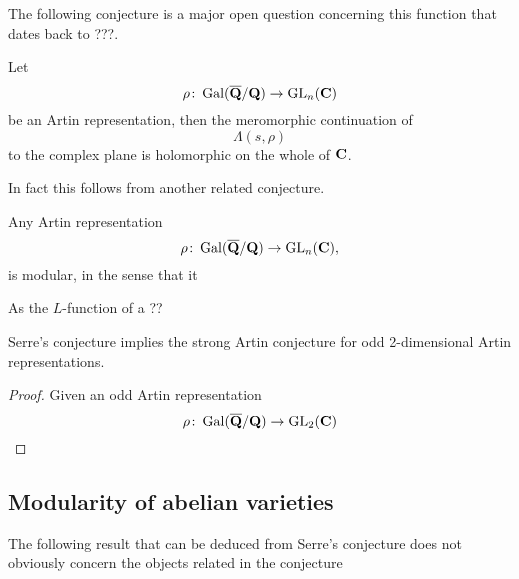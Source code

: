 \documentclass[a4paper,12pt]{article}
\begin{document}
The following conjecture is a major open question concerning this function that dates back to ???. %

\begin{conjecture}
Let
\[
\rho\colon \operatorname{Gal}(\overline{\mathbf{Q}}/\mathbf{Q}) \to \operatorname{GL}_n(\mathbf{C})
\]
be an Artin representation, then the meromorphic continuation of
\[
\Lambda(s,\rho)
\]
to the complex plane is holomorphic on the whole of $\mathbf{C}$.
\end{conjecture}

In fact this follows from another related conjecture.

\begin{conjecture}
Any Artin representation
\[
\rho\colon \operatorname{Gal}(\overline{\mathbf{Q}}/\mathbf{Q}) \to \operatorname{GL}_n(\mathbf{C}),
\]
is modular, in the sense that it
\end{conjecture}

As the $L$-function of a ??

\begin{prop}
Serre's conjecture implies the strong Artin conjecture for odd 2-dimensional Artin representations.
\end{prop}
\begin{proof}
Given an odd Artin representation
\[
\rho\colon \operatorname{Gal}(\overline{\mathbf{Q}}/\mathbf{Q})\to \operatorname{GL}_2(\mathbf{C})
\]

\end{proof}


\subsection{Modularity of abelian varieties}
The following result that can be deduced from Serre's conjecture does not obviously concern the objects related in the conjecture




\end{document}
